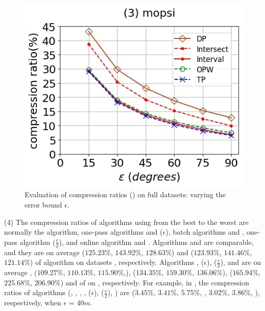 \begin{figure}[tb!]
	\includegraphics[scale=0.250]{Figures/Exp-DAD-CR-epsilon-mopsi.jpg}		
	\vspace{-2ex}
	\caption{\small Evaluation of compression ratios (\dad) on full datasets: varying the error bound $\epsilon$.}
	\label{fig:cr-dad-epsilon}
	\vspace{-2ex}
\end{figure}

\sstab(4) The compression ratios of algorithms using \sed from the best
to the worst are normally the \opt algorithm, one-pass algorithms  and \cised($\epsilon$), batch algorithms \tpa and
\dpa, one-pass algorithm \cised($\frac{\epsilon}{2}$), and online algorithm {\dagots} and \squishe.
%
{Algorithms \tpa and \dpa are comparable, and they are on average
($125.23\%$, $143.92\%$, $128.63\%$) and ($123.93\%$, $141.46\%$, $121.14\%$)
 of algorithm \opt on datasets \dSets, respectively.}
%
{Algorithms , \cised(${\epsilon}$), \cised($\frac{\epsilon}{2}$), \squishe and {\dagots} are on average , ($109.27\%$, $110.13\%$, $115.90\%$,), ($134.35\%$, $159.30\%$, $136.06\%$), ($165.94\%$, $225.68\%$, $206.90\%$) and 
 of \opt on \dSets, respectively.}
%
For example, in \mopsi, the compression ratios of algorithms
(\tpa, \dpa, \squishe, {\dagots}, \cised(${\epsilon}$), \cised($\frac{\epsilon}{2}$),  )
are ($3.45\%$, $3.41\%$, $5.75\%$, , $3.02\%$, $3.86\%$,  ), respectively, when $\epsilon$ = $40m$.
%
%
%


